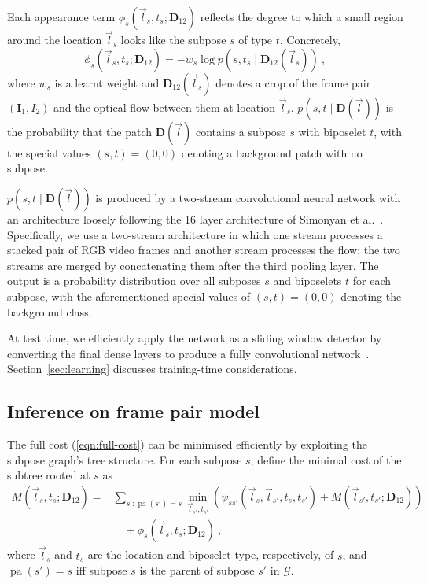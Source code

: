 \documentclass[runningheads]{llncs}
\newcommand{\mat}{\mathbf}
\DeclareMathOperator{\pa}{pa}
\begin{document}
Each appearance term $\phi_s(\vec l_s, t_s; \mat D_{12})$ reflects the degree to
which a small region around the location $\vec l_s$ looks like the subpose $s$
of type $t$. Concretely,
\begin{equation}\label{eqn:unary-cost}
\phi_s(\vec l_s, t_s; \mat D_{12}) = -w_s \log p(s, t_s \mid \mat D_{12}(
\vec l_s))~,
\end{equation}
%
where $w_s$ is a learnt weight and $\mat D_{12}(\vec l_s)$ denotes a crop of the
frame pair $(\mat I_1, I_2)$ and the optical flow between them at location
$\vec l_s$. $p(s, t \mid \mat D(\vec l))$ is the probability that the patch
$\mat D(\vec l)$ contains a subpose $s$ with biposelet $t$, with the special
values $(s, t) = (0, 0)$ denoting a background patch with no subpose.

$p(s, t \mid \mat D(\vec l))$ is produced by a two-stream convolutional neural
network with an architecture loosely following the 16 layer architecture of
Simonyan et al.~\cite{simonyan2014very}. Specifically, we use a two-stream
architecture in which one stream processes a stacked pair of RGB video frames
and another stream processes the flow; the two streams are merged by
concatenating them after the third pooling layer. The output is a probability
distribution over all subposes $s$ and biposelets $t$ for each subpose, with the
aforementioned special values of $(s, t) = (0, 0)$ denoting the background
class.

At test time, we efficiently apply the network as a sliding window detector by
converting the final dense layers to produce a fully convolutional
network~\cite{sermanet2013overfeat}. Section~\ref{sec:learning} discusses
training-time considerations.


\subsection{Inference on frame pair model}

The full cost (\ref{eqn:full-cost}) can be minimised efficiently by exploiting
the subpose graph's tree structure. For each subpose $s$, define the minimal
cost of the subtree rooted at $s$ as
%
\begin{equation}\label{eqn:reccost}
\begin{split}
M(\vec l_s, t_s; \mat D_{12}) =
&\sum_{s' : \pa(s') = s} \min_{\vec l_{s'}, t_{s'}} \left(\psi_{s s'}(\vec l_s,
\vec l_{s'}, t_s, t_{s'}) + M(\vec l_{s'}, t_{s'}; \mat D_{12})\right)
\\&\quad+ \phi_s(\vec l_s, t_s; \mat D_{12})~,
\end{split}
\end{equation}
%
where $\vec l_s$ and $t_s$ are the location and biposelet type, respectively, of
$s$, and $\pa(s') = s$ iff subpose $s$ is the parent of subpose $s'$ in
$\mathcal G$.
\end{document}
